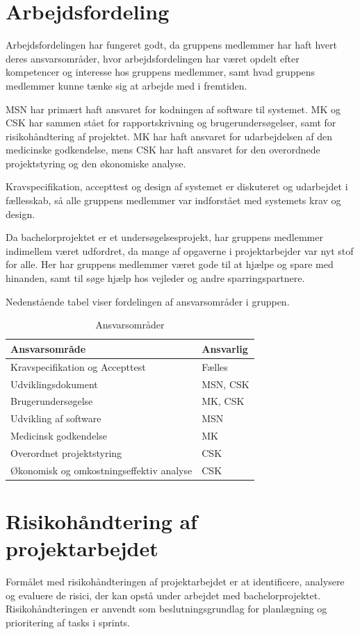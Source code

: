 \section{Arbejdsfordeling}
Arbejdsfordelingen har fungeret godt, da gruppens medlemmer har haft hvert deres ansvarsområder, hvor arbejdsfordelingen har været opdelt efter kompetencer og interesse hos gruppens medlemmer, samt hvad gruppens medlemmer kunne tænke sig at arbejde med i fremtiden.  

MSN har primært haft ansvaret for kodningen af software til systemet. MK og CSK har sammen stået for rapportskrivning og brugerundersøgelser, samt for risikohåndtering af projektet. MK har haft ansvaret for udarbejdelsen af den medicinske godkendelse, mens CSK har haft ansvaret for den overordnede projektstyring og den økonomiske analyse. 

Kravspecifikation, accepttest og design af systemet er diskuteret og udarbejdet i fællesskab, så alle gruppens medlemmer var indforstået med systemets krav og design. 

Da bachelorprojektet er et undersøgelsesprojekt, har gruppens medlemmer indimellem været udfordret, da mange af opgaverne i projektarbejder var nyt stof for alle. Her har gruppens medlemmer været gode til at hjælpe og spare med hinanden, samt til søge hjælp hos vejleder og andre sparringspartnere.  

Nedenstående tabel viser fordelingen af ansvarsområder i gruppen. 

\begin{table}[h]
\centering
\begin{tabular}{|l| p{}|}
\hline
\textbf{Ansvarsområde} &  \textbf{Ansvarlig} \\\hline
Kravspecifikation og Accepttest & Fælles \\\hline
Udviklingsdokument & MSN, CSK\\\hline
Brugerundersøgelse & MK, CSK \\\hline
Udvikling af software & MSN\\\hline
Medicinsk godkendelse & MK \\\hline
Overordnet projektstyring & CSK \\\hline
Økonomisk og omkostningseffektiv analyse & CSK \\\hline
\end{tabular}
\caption{Ansvarsområder}
\end{table}

\section{Risikohåndtering af projektarbejdet}
Formålet med risikohåndteringen af projektarbejdet er at identificere, analysere og evaluere de risici, der kan opstå under arbejdet med bachelorprojektet. Risikohåndteringen er anvendt som beslutningsgrundlag for planlægning og prioritering af tasks i sprints. 

